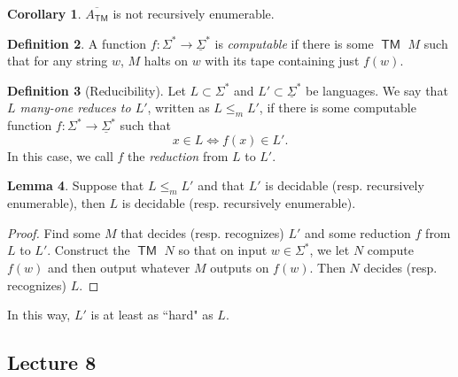 \documentclass[10pt,letterpaper,cm]{nupset}
\theoremstyle{definition}
\newtheorem{definition}{Definition}[subsection]
\theoremstyle{theorem}
\newtheorem{lemma}[definition]{Lemma}
\newtheorem{corollary}[definition]{Corollary}
\theoremstyle{remark}
\newcommand{\1}{\mathbf{1}}
\newcommand{\0}{\vec 0}
\DeclareMathOperator{\TM}{\mathsf{TM}}
\begin{document}
\begin{corollary}
$\overline{A_{\TM}}$ is not recursively enumerable. 
\end{corollary}

\begin{definition}\label{computable}
A function $f: \Sigma^{\ast} \to \underline{\Sigma}^{\ast}$ is \textit{computable} if there is some $\TM$ $M$ such that for any string $w$, $M$ halts on $w$ with its tape containing just $f(w)$. 
\end{definition}

\begin{definition}[Reducibility]
Let $L\subset \Sigma^{\ast}$ and $L' \subset \underline{\Sigma}^{\ast}$ be languages. We say that \textit{$L$ many-one reduces to $L'$}, written as $L \leq_m L'$, if there is some computable function $f: \Sigma^{\ast} \to \underline{\Sigma}^{\ast}$ such that $$x\in L \iff f(x) \in L'.$$ In this case, we call $f$ the \textit{reduction} from $L$ to $L'$.
\end{definition}

\begin{lemma}
Suppose that $L \leq_m L'$ and that $L'$ is decidable (resp. recursively enumerable), then $L$ is decidable (resp. recursively enumerable).
\end{lemma}
\begin{proof}
Find some $M$ that decides (resp. recognizes) $L'$ and some reduction $f$ from $L$ to $L'$. Construct the $\TM$ $N$ so that on input $w\in \Sigma^{\ast}$, we let $N$ compute $f(w)$ and then output whatever $M$ outputs on $f(w)$. Then $N$ decides (resp. recognizes) $L$. 
\end{proof}

In this way, $L'$ is at least as ``hard" as $L$.

\subsection{Lecture 8}
\end{document}
